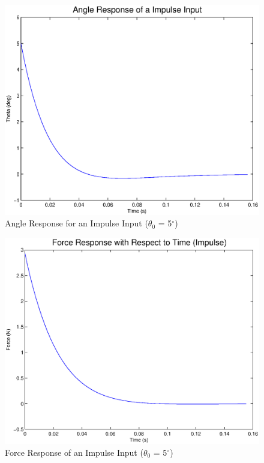 \documentclass{article}
\begin{document}
\begin{figure}[!htb]
    \centering
    \includegraphics[scale=0.6]{3}
    \caption{Angle Response for an Impulse Input ($\theta_0$ = 5$^{\circ}$)}
\end{figure} 

\begin{figure}[!htb]
    \centering
    \includegraphics[scale=0.6]{4}
    \caption{Force Response of an Impulse Input ($\theta_0$ = 5$^{\circ}$)}
\end{figure} 
\end{document}
